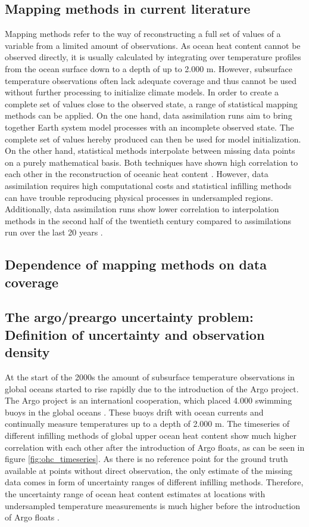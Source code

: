 \documentclass[Masterarbeit.tex]{subfile}
\begin{document}
	\subsection{Mapping methods in current literature}
	Mapping methods refer to the way of reconstructing a full set of values of a variable from a limited amount of observations. As ocean heat content cannot be observed directly, it is usually calculated by integrating over temperature profiles from the ocean surface down to a depth of up to 2.000 m. However, subsurface temperature observations often lack adequate coverage and thus cannot be used without further processing to initialize climate models. In order to create a complete set of values close to the observed state, a range of statistical mapping methods can be applied. On the one hand, data assimilation runs aim to bring together Earth system model processes with an incomplete observed state. The complete set of values hereby produced can then be used for model initialization. On the other hand, statistical methods interpolate between missing data points on a purely mathematical basis. Both techniques have shown high correlation to each other in the reconstruction of oceanic heat content \cite{brune_time_2018}. However, data assimilation requires high computational costs and statistical infilling methods can have trouble reproducing physical processes in undersampled regions. Additionally, data assimilation runs show lower correlation to interpolation methods in the second half of the twentieth century compared to assimilations run over the last 20 years \citep{brune_time_2018}. \\
	
	\subsection{Dependence of mapping methods on data coverage}
	\subsection{The argo/preargo uncertainty problem: Definition of uncertainty and observation density}
	
	At the start of the 2000s the amount of subsurface temperature observations in global oceans started to rise rapidly due to the introduction of the Argo project. The Argo project is an internationl cooperation, which placed 4.000 swimming buoys in the global oceans \citep{roemmich_Argo_2009}. These buoys drift with ocean currents and continually measure temperatures up to a depth of 2.000 m. The timeseries of different infilling methods of global upper ocean heat content show much higher correlation with each other after the introduction of Argo floats, as can be seen in figure \ref{fig:ohc_timeseries}. As there is no reference point for the ground truth available at points without direct observation, the only estimate of the missing data comes in form of uncertainty ranges of different infilling methods. Therefore, the uncertainty range of ocean heat content estimates at locations with undersampled temperature measurements is much higher before the introduction of Argo floats \citep{levitus_world_2012}.
	
\end{document}
